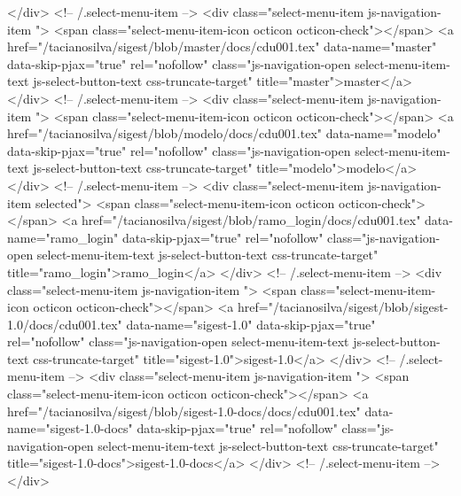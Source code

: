             </div> <!-- /.select-menu-item -->
            <div class="select-menu-item js-navigation-item ">
              <span class="select-menu-item-icon octicon octicon-check"></span>
              <a href="/tacianosilva/sigest/blob/master/docs/cdu001.tex"
                 data-name="master"
                 data-skip-pjax="true"
                 rel="nofollow"
                 class="js-navigation-open select-menu-item-text js-select-button-text css-truncate-target"
                 title="master">master</a>
            </div> <!-- /.select-menu-item -->
            <div class="select-menu-item js-navigation-item ">
              <span class="select-menu-item-icon octicon octicon-check"></span>
              <a href="/tacianosilva/sigest/blob/modelo/docs/cdu001.tex"
                 data-name="modelo"
                 data-skip-pjax="true"
                 rel="nofollow"
                 class="js-navigation-open select-menu-item-text js-select-button-text css-truncate-target"
                 title="modelo">modelo</a>
            </div> <!-- /.select-menu-item -->
            <div class="select-menu-item js-navigation-item selected">
              <span class="select-menu-item-icon octicon octicon-check"></span>
              <a href="/tacianosilva/sigest/blob/ramo_login/docs/cdu001.tex"
                 data-name="ramo_login"
                 data-skip-pjax="true"
                 rel="nofollow"
                 class="js-navigation-open select-menu-item-text js-select-button-text css-truncate-target"
                 title="ramo_login">ramo_login</a>
            </div> <!-- /.select-menu-item -->
            <div class="select-menu-item js-navigation-item ">
              <span class="select-menu-item-icon octicon octicon-check"></span>
              <a href="/tacianosilva/sigest/blob/sigest-1.0/docs/cdu001.tex"
                 data-name="sigest-1.0"
                 data-skip-pjax="true"
                 rel="nofollow"
                 class="js-navigation-open select-menu-item-text js-select-button-text css-truncate-target"
                 title="sigest-1.0">sigest-1.0</a>
            </div> <!-- /.select-menu-item -->
            <div class="select-menu-item js-navigation-item ">
              <span class="select-menu-item-icon octicon octicon-check"></span>
              <a href="/tacianosilva/sigest/blob/sigest-1.0-docs/docs/cdu001.tex"
                 data-name="sigest-1.0-docs"
                 data-skip-pjax="true"
                 rel="nofollow"
                 class="js-navigation-open select-menu-item-text js-select-button-text css-truncate-target"
                 title="sigest-1.0-docs">sigest-1.0-docs</a>
            </div> <!-- /.select-menu-item -->
        </div>

